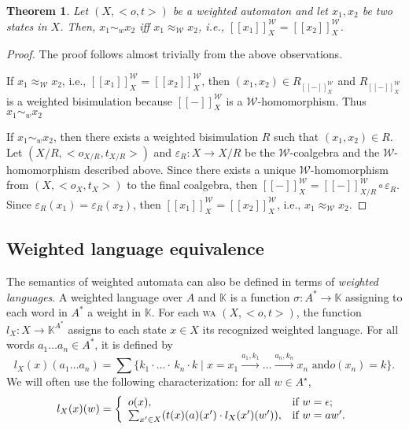 \documentclass[3p]{elsarticle}
\def\tr#1{\stackrel{#1}{\to}}          %
\newcommand{\fW}{\mathcal{W}}    %
\newcommand{\beh}[3]{\left[\!\left[ #1 \right]\!\right]^{#2}_{#3}} %
\newcommand{\comp}{\circ}               %
\newcommand{\K}{\mathbb{K}}            %
\newtheorem{theorem}{Theorem}
\begin{document}
\begin{theorem}\label{theo:bis}
Let $(X,<o,t>)$ be a weighted automaton and let $x_1,x_2$ be two
states in $X$. Then, $x_1\sim_w x_2$ iff $x_1\approx_\fW x_2$, i.e.,
$\beh{x_1}{\fW}{X}= \beh{x_2}{\fW}{X}$.
\end{theorem}
\begin{proof}
The proof follows almost trivially from the above observations.

%
If $x_1\approx_\fW x_2$, i.e.,
$\beh{x_1}{\fW}{X}=\beh{x_2}{\fW}{X}$, then $(x_1,x_2)\in
R_{\beh{-}{\fW}{X}}$ and $R_{\beh{-}{\fW}{X}}$ is a weighted
bisimulation because $\beh{-}{\fW}{X}$ is a $\fW$-homomorphism. Thus
$x_1\sim_w x_2$

If $x_1 \sim_w x_2$, then there exists a weighted bisimulation $R$
such that $(x_1,x_2)\in R$. Let $(X/R, <o_{X/R},t_{X/R}>)$ and
$\varepsilon_R\colon  X \to X/R$ be the $\fW$-coalgebra and the
$\fW$-homomorphism described above. Since there exists a unique
$\fW$-homomorphism from $(X, <o_X,t_X>)$ to the final coalgebra,
then $\beh{-}{\fW}{X} =
 \beh{-}{\fW}{X/R} \comp \varepsilon_R$. Since
$\varepsilon_R(x_1)=\varepsilon_R(x_2)$, then
$\beh{x_1}{\fW}{X}=\beh{x_2}{\fW}{X}$, i.e., $x_1 \approx_\fW x_2$.
\end{proof}

\subsection{Weighted language equivalence}
The semantics of weighted automata can also be defined in terms of
\emph{weighted languages}. A weighted language over $A$ and $\K$ is
a function $\sigma\colon  A^* \to \K$ assigning to each word in
$A^*$ a weight in $\K$. For each \textsc{wa} $(X,<o,t>)$, the
function $l_X\colon X \to \K^{A^*}$ assigns to each state $x \in X$
its recognized weighted language. For all words $a_1\dots a_n \in
A^*$, it is defined by
$$l_X(x)(a_1\dots a_n)=\sum \{k_1 \cdot  \stackrel{}{\dots} \cdot\,
k_n \cdot k \mid x=x_1\tr{a_1,k_1}\dots \tr{a_n,k_n}x_n \text{ and
}o(x_n)=k\}\text{.}$$
We will often use the following characterization: for all $ w \in
A^{\star}$,
$$l_X(x)(w)= \left\{%
\begin{array}{ll}
    o(x), & \hbox{if $w=\epsilon$;} \\
    \sum_{x'\in X}(t(x)(a)(x')\cdot l_X(x')(w')), & \hbox{if $w=aw'$.} \\
\end{array}%
\right.$$
\end{document}
